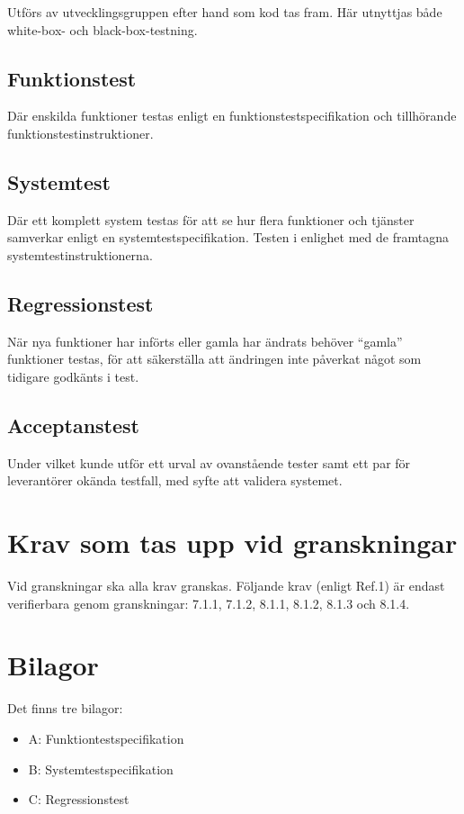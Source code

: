 \documentclass[a4paper]{article}
\begin{document}
Utförs av utvecklingsgruppen efter hand som kod tas fram. Här utnyttjas både white-box- och black-box-testning.

\subsection{Funktionstest}

Där enskilda funktioner testas enligt en funktionstestspecifikation och tillhörande funktionstestinstruktioner. 

\subsection{Systemtest}

Där ett komplett system testas för att se hur flera funktioner och tjänster samverkar enligt en systemtestspecifikation. Testen i enlighet med de framtagna systemtestinstruktionerna. 

\subsection{Regressionstest}

När nya funktioner har införts eller gamla har ändrats behöver ``gamla'' funktioner testas, för att säkerställa att ändringen inte påverkat något som tidigare godkänts i test.

\subsection{Acceptanstest}

Under vilket kunde utför ett urval av ovanstående tester samt ett par för leverantörer okända testfall, med syfte att validera systemet.

\section{Krav som tas upp vid granskningar}

Vid granskningar ska alla krav granskas.
Följande krav (enligt Ref.1) är endast verifierbara genom granskningar: 7.1.1, 7.1.2, 8.1.1, 8.1.2, 8.1.3 och 8.1.4.

\section{Bilagor}

Det finns tre bilagor:

\begin{itemize}
\item A: Funktiontestspecifikation
\item B: Systemtestspecifikation
\item C: Regressionstest

\end{itemize}
\end{document}
